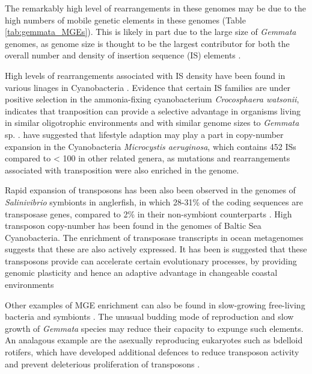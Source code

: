 The remarkably high level of rearrangements in these genomes may be due to the high numbers of mobile genetic elements in these genomes (Table \ref{tab:gemmata_MGEs}). This is likely in part due to the large size of \textit{Gemmata} genomes, as genome size is thought to be the largest contributor for both the overall number and density of insertion sequence (IS) elements \citep{Touchon2007-an}. 

High levels of rearrangements associated with IS density have been found in various linages in Cyanobacteria \citep{Bhaya2007-zk}. Evidence that certain IS families are under positive selection in the ammonia-fixing cyanobacterium \textit{Crocosphaera watsonii}, indicates that tranposition can provide a selective advantage in organisms living in similar oligotrophic environments and with similar genome sizes to \textit{Gemmata} sp. . \citep{Kaneko2007-qp} have suggested that lifestyle adaption may play a part in copy-number expansion in the Cyanobacteria \textit{Microcystis aeruginosa}, which contains 452 ISs compared to < 100 in other related genera, as mutations and rearrangements associated with transposition were also enriched in the genome.

Rapid expansion of transposons has been also been observed in the genomes of \textit{Salinivibrio} symbionts in anglerfish, in which 28-31\% of the coding sequences are transposase genes, compared to 2\% in their non-symbiont counterparts \citep{Hendry2018-vk}. High transposon copy-number has been found in the genomes of Baltic Sea Cyanobacteria. The enrichment of transposase transcripts in ocean metagenomes suggests that these are also actively expressed. It has been is suggested that these transposons provide can accelerate certain evolutionary processes, by providing genomic plasticity and hence an adaptive advantage in changeable coastal environments \citep{Vigil-Stenman2017-yz}

Other examples of MGE enrichment can also be found in slow-growing free-living bacteria and symbionts \citep{Vigil-Stenman2015-et,Schmitz-Esser2011-ss}. The unusual budding mode of reproduction and slow growth of \textit{Gemmata} species may reduce their capacity to expunge such elements. An analagous example are the asexually reproducing eukaryotes such as bdelloid rotifers, which have developed additional defences to reduce transposon activity \citep{Flot2013-cg} and prevent deleterious proliferation of transposons \citep{Arkhipova2005-me}.  


